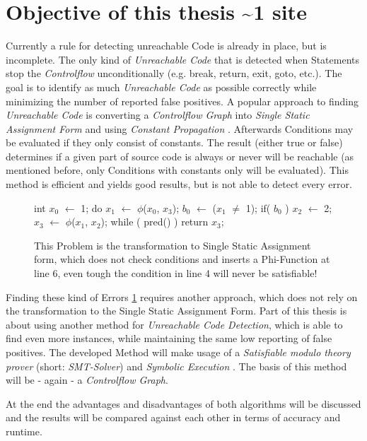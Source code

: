 \section{Objective of this thesis \textasciitilde 1 site}
Currently a rule for detecting unreachable Code is already in place, but is incomplete.
The only kind of \emph{Unreachable Code} that is detected when Statements stop the \emph{Controlflow} unconditionally (e.g. break, return, exit, goto, etc.).
The goal is to identify as much \emph{Unreachable Code} as possible correctly while minimizing the number of reported false positives.
A popular approach to finding \emph{Unreachable Code} is converting a \emph{Controlflow Graph} into \emph{Single Static Assignment Form} and using \emph{Constant Propagation} \cite{Click_1995}.
Afterwards Conditions may be evaluated if they only consist of constants. The result (either true or false) determines if a given part of source code is always or never will be reachable (as mentioned before, only Conditions with constants only will be evaluated).
This method is efficient and yields good results, but is not able to detect every error.
\begin{figure}
    \begin{GenericCode}
    int $x_0$ $\leftarrow$ 1;
    do { $x_1$ $\leftarrow$ $\phi$($x_0$, $x_3$);
        $b_0$ $\leftarrow$ ($x_{1}$ $\neq$ 1);
        if( $b_0$ )
            $x_2$ $\leftarrow$ 2;
        $x_3$ $\leftarrow$ $\phi$($x_1$, $x_2$);
    } while ( pred() )
    return $x_3$;
    \end{GenericCode}
    \caption{This Problem \cite{Click_1995} is the transformation to Single Static Assignment form, which does not check conditions and inserts a Phi-Function at line 6, even tough the condition in line 4 will never be satisfiable!}
    \label{code:ssa-defect}
\end{figure}
Finding these kind of Errors \ref{code:ssa-defect} requires another approach, which does not rely on the transformation to the Single Static Assignment Form.
Part of this thesis is about using another method for \emph{Unreachable Code Detection}, which is able to find even more instances, while maintaining the same low reporting of false positives.
The developed Method will make usage of a \emph{Satisfiable modulo theory prover} (short: \emph{SMT-Solver}) and \emph{Symbolic Execution} . The basis of this method will be - again - a \emph{Controlflow Graph}.

At the end the advantages and disadvantages of both algorithms will be discussed and the results will be compared against each other in terms of accuracy and runtime.



